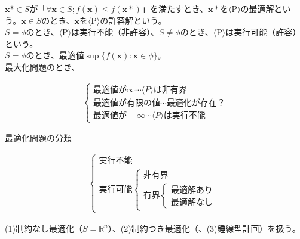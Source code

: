 \documentclass[a4j]{jarticle}
\begin{document}
$\bm{x}\ast\in S$が「$\forall\bm{x}\in S; f(\bm{x})\le f(\bm{x}\ast)$」を満たすとき、$\bm{x}\ast$を$\langle$P$\rangle$の最適解という。$\bm{x}\in S$のとき、$\bm{x}$を$\langle$P$\rangle$の許容解という。\\

$S=\phi$のとき、$\langle$P$\rangle$は実行不能（非許容）、$S\neq\phi$のとき、$\langle$P$\rangle$は実行可能（許容）という。\\

$S=\phi$のとき、最適値$\sup\{f(\bm{x}):\bm{x}\in\phi\}$。\\

最大化問題のとき、

\begin{eqnarray*}
  \begin{cases}最適値が\infty\cdots\langle P\rangle は非有界\\最適値が有限の値\cdots 最適化が存在？\\最適値が-\infty\cdots\langle P\rangle は実行不能\end{cases}
\end{eqnarray*}

最適化問題の分類

\begin{eqnarray*}
  \begin{cases}実行不能\\実行可能\begin{cases}非有界\\有界\begin{cases}最適解あり\\最適解なし\end{cases}\end{cases}\end{cases}
\end{eqnarray*}

(1)制約なし最適化（$S=\mathbb{R}^{n}$）、(2)制約つき最適化（、(3)錘線型計画）を扱う。
\end{document}
